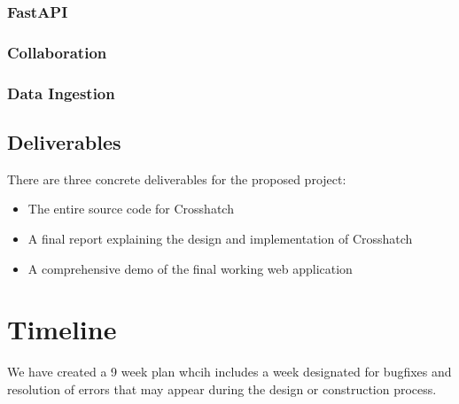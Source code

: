 \documentclass{article}
\begin{document}
\subsubsection{FastAPI}
\label{fastapi}

\subsubsection{Collaboration}
\label{collabarch}

\subsubsection{Data Ingestion}
\label{ingestarch}




\subsection{Deliverables}
There are three concrete deliverables for the proposed project:
\begin{itemize}
  \item The entire source code for Crosshatch
  \item A final report explaining the design and implementation of Crosshatch
  \item A comprehensive demo of the final working web application
\end{itemize}

\section{Timeline}
We have created a 9 week plan whcih includes a week designated for bugfixes and resolution of errors that may
appear during the design or construction process.
\end{document}
